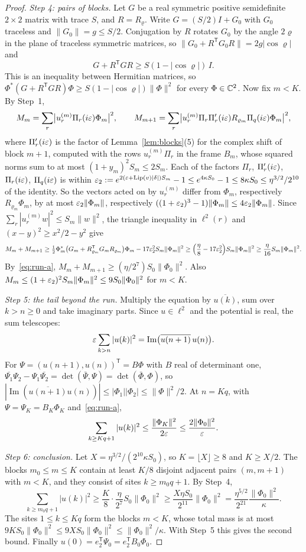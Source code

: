 \begin{proof}
\emph{Step 4: pairs of blocks.} Let $G$ be a real symmetric positive semidefinite $2\times2$ matrix with trace $S$, and $R=R_\varrho$. Write $G=(S/2)I+G_0$ with $G_0$ traceless and $\|G_0\|=g\le S/2$. Conjugation by $R$ rotates $G_0$ by the angle $2\varrho$ in the plane of traceless symmetric matrices, so $\|G_0+R^{\mathsf T}G_0R\|=2g|\cos\varrho|$ and
\[
G+R^{\mathsf T}GR\ge S(1-|\cos\varrho|)\,I .
\]
This is an inequality between Hermitian matrices, so $\Phi^*(G+R^{\mathsf T}GR)\Phi\ge S(1-|\cos\varrho|)\|\Phi\|^2$ for every $\Phi\in\mathbb C^2$. Now fix $m<K$. By Step~1,
\[
M_m=\sum_r\bigl|u^{(m)}_r\Pi_r(i\varepsilon)\Phi_m\bigr|^2,\qquad M_{m+1}=\sum_r\bigl|u^{(m)}_r\Pi_r\Pi'_r(i\varepsilon)R_{\varrho_m}\Pi_q(i\varepsilon)\Phi_m\bigr|^2,
\]
where $\Pi'_r(i\varepsilon)$ is the factor of Lemma~\ref{lem:blocks}(5) for the complex shift of block $m+1$, computed with the rows $u^{(m)}_r\Pi_r$ in the frame $B_m$, whose squared norms sum to at most $(1+y_m)^2S_m\le2S_m$. Each of the factors $\Pi_r$, $\Pi'_r(i\varepsilon)$, $\Pi_r(i\varepsilon)$, $\Pi_q(i\varepsilon)$ is within $\varepsilon_2:=e^{2(\varepsilon+\operatorname{Lip}(v)|\delta|)S_m}-1\le e^{4\kappa S_0}-1\le8\kappa S_0\le\eta^{3/2}/2^{10}$ of the identity. So the vectors acted on by $u^{(m)}_r$ differ from $\Phi_m$, respectively $R_{\varrho_m}\Phi_m$, by at most $\varepsilon_2\|\Phi_m\|$, respectively $((1+\varepsilon_2)^3-1)\|\Phi_m\|\le4\varepsilon_2\|\Phi_m\|$. Since $\sum_r|u^{(m)}_rw|^2\le S_m\|w\|^2$, the triangle inequality in $\ell^2(r)$ and $(x-y)^2\ge x^2/2-y^2$ give
\[
M_m+M_{m+1}\ge\tfrac12\Phi_m^*\bigl(G_m+R_{\varrho_m}^{\mathsf T}G_mR_{\varrho_m}\bigr)\Phi_m-17\varepsilon_2^2S_m\|\Phi_m\|^2\ge\Bigl(\frac\eta8-17\varepsilon_2^2\Bigr)S_m\|\Phi_m\|^2\ge\frac\eta{16}S_m\|\Phi_m\|^2 .
\]
By~\eqref{eq:run-a}, $M_m+M_{m+1}\ge(\eta/2^7)S_0\|\Phi_0\|^2$. Also $M_m\le(1+\varepsilon_2)^2S_m\|\Phi_m\|^2\le9S_0\|\Phi_0\|^2$ for $m<K$.

\emph{Step 5: the tail beyond the run.} Multiply the equation by $\overline{u(k)}$, sum over $k>n\ge0$ and take imaginary parts. Since $u\in\ell^2$ and the potential is real, the sum telescopes:
\[
\varepsilon\sum_{k>n}|u(k)|^2=\operatorname{Im}\bigl(\overline{u(n+1)}\,u(n)\bigr).
\]
For $\Psi=(u(n+1),u(n))^{\mathsf T}=B\Phi$ with $B$ real of determinant one, $\overline{\Psi_1}\Psi_2-\Psi_1\overline{\Psi_2}=\det(\bar\Psi,\Psi)=\det(\bar\Phi,\Phi)$, so $|\operatorname{Im}(\overline{u(n+1)}u(n))|\le|\Phi_1||\Phi_2|\le\|\Phi\|^2/2$. At $n=Kq$, with $\Psi=\Psi_K=B_K\Phi_K$ and~\eqref{eq:run-a},
\[
\sum_{k\ge Kq+1}|u(k)|^2\le\frac{\|\Phi_K\|^2}{2\varepsilon}\le\frac{2\|\Phi_0\|^2}{\varepsilon}.
\]

\emph{Step 6: conclusion.} Let $X=\eta^{3/2}/(2^{10}\kappa S_0)$, so $K=\lfloor X\rfloor\ge8$ and $K\ge X/2$. The blocks $m_0\le m\le K$ contain at least $K/8$ disjoint adjacent pairs $(m,m+1)$ with $m<K$, and they consist of sites $k\ge m_0q+1$. By Step~4,
\[
\sum_{k\ge m_0q+1}|u(k)|^2\ge\frac K8\cdot\frac{\eta}{2^7}S_0\|\Phi_0\|^2\ge\frac{X\eta S_0}{2^{11}}\|\Phi_0\|^2=\frac{\eta^{5/2}}{2^{21}}\frac{\|\Phi_0\|^2}{\kappa}.
\]
The sites $1\le k\le Kq$ form the blocks $m<K$, whose total mass is at most $9KS_0\|\Phi_0\|^2\le9XS_0\|\Phi_0\|^2\le\|\Phi_0\|^2/\kappa$. With Step~5 this gives the second bound. Finally $u(0)=e_2^{\mathsf T}\Psi_0=e_2^{\mathsf T}B_0\Phi_0$.
\end{proof}

